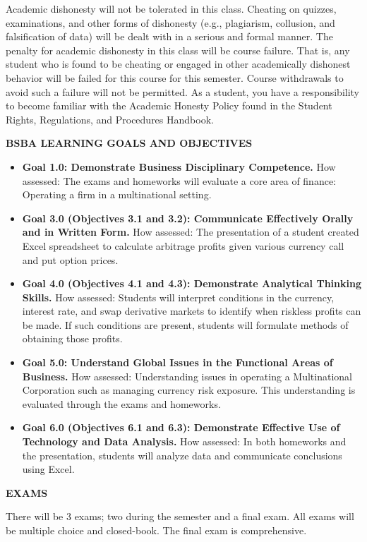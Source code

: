 \documentclass{article}
\begin{document}
Academic dishonesty will not be tolerated in this class. Cheating
on quizzes, examinations, and other forms of dishonesty (e.g., plagiarism, collusion, and
falsification of data) will be dealt with in a serious and formal manner. The penalty for academic
dishonesty in this class will be course failure. That is, any student who is found to be cheating
or engaged in other academically dishonest behavior will be failed for this course for this
semester. Course withdrawals to avoid such a failure will not be permitted. As a student, you
have a responsibility to become familiar with the Academic Honesty Policy found in the Student
Rights, Regulations, and Procedures Handbook.\\
\begin{center}
{\bf BSBA LEARNING GOALS AND OBJECTIVES}
\end{center} 
\begin{itemize}
\item {\bf Goal 1.0: Demonstrate Business Disciplinary Competence.}  How assessed:  The exams and homeworks will evaluate a core area of finance: Operating a firm in a multinational setting. 
\item {\bf Goal 3.0 (Objectives 3.1 and 3.2):  Communicate Effectively Orally and in Written Form.}  How assessed:  The presentation of a student created Excel spreadsheet to calculate arbitrage profits given various currency call and put option prices.
\item {\bf Goal 4.0 (Objectives 4.1 and 4.3): Demonstrate Analytical Thinking Skills.} How assessed:  Students will interpret conditions in the currency, interest rate, and swap derivative markets to identify when riskless profits can be made.  If such conditions are present, students will formulate methods of obtaining those profits.
\item {\bf Goal 5.0: Understand Global Issues in the Functional Areas of Business.} How assessed:  Understanding issues in operating a Multinational Corporation such as managing currency risk exposure.  This understanding is evaluated through the exams and homeworks.
\item {\bf Goal 6.0 (Objectives 6.1 and 6.3):  Demonstrate Effective Use of Technology and Data Analysis.} How assessed:  In both homeworks and the presentation, students will analyze data and communicate conclusions using Excel.
\end{itemize}
\begin{center}
{\bf EXAMS}
\end{center} 
There will be 3 exams; two during the semester and a final exam.  All exams will be multiple choice and closed-book.  The final exam is comprehensive.  \\
\end{document}
